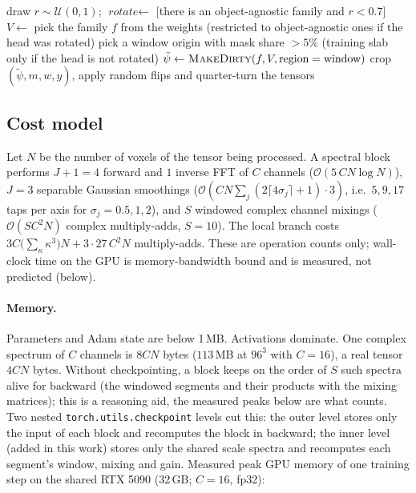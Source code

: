 \documentclass[11pt]{article}
\newcommand{\code}[1]{\texttt{#1}}
\theoremstyle{remark}
\begin{document}
\begin{algorithm}[h]
\caption{One training sample (\code{RC1Source.patch})}
\begin{algorithmic}[1]
\State draw $r\sim\mathcal U(0,1)$; $\textit{rotate}\gets$ [there is an object-agnostic family and $r<0.7$]
 $V\gets$  \EndIf
\State pick the family $f$ from the weights (restricted to object-agnostic ones if the head was rotated)
\State pick a window origin with mask share $>5\%$ (training slab only if the head is not rotated)
\State $\tilde\psi\gets\textsc{MakeDirty}(f,V,\text{region}=\text{window})$ 
\State crop $(\tilde\psi,m,w,y)$, apply random flips and quarter-turn \State \Return the tensors
\end{algorithmic}
\end{algorithm}

\subsection{Cost model}
Let $N$ be the number of voxels of the tensor being processed. A spectral block performs $J+1=4$ forward and $1$ inverse FFT of $C$ channels ($\mathcal O(5\,CN\log N)$), $J=3$ separable Gaussian smoothings ($\mathcal O(CN\sum_j(2\lceil4\sigma_j\rceil+1)\cdot3)$, i.e.\ $5,9,17$ taps per axis for $\sigma_j=0.5,1,2$),
and $S$ windowed complex channel mixings ($\mathcal O(SC^2N)$ complex multiply-adds, $S=10$). The local branch costs $3C\big(\sum_\kappa\kappa^3\big)N+3\cdot27\,C^2N$ multiply-adds. These are operation counts only; wall-clock time on the GPU is memory-bandwidth bound and is measured, not predicted (below).

\paragraph{Memory.} Parameters and Adam state are below 1\,MB. Activations dominate. One complex spectrum of $C$ channels is $8CN$ bytes ($113$\,MB at $96^3$ with $C=16$), a real tensor $4CN$ bytes. Without checkpointing, a block keeps on the order of $S$ such spectra alive for backward (the windowed segments and their products with the mixing matrices); this is a reasoning aid, the measured peaks below are what counts.
Two nested \code{torch.utils.checkpoint} levels \cite{checkpoint} cut this: the outer level stores only the input of each block and recomputes the block in backward; the inner level (added in this work) stores only the shared scale spectra and recomputes each segment's window, mixing and gain.
Measured peak GPU memory of one training step on the shared RTX 5090 (32\,GB; $C=16$, fp32):
\end{document}
